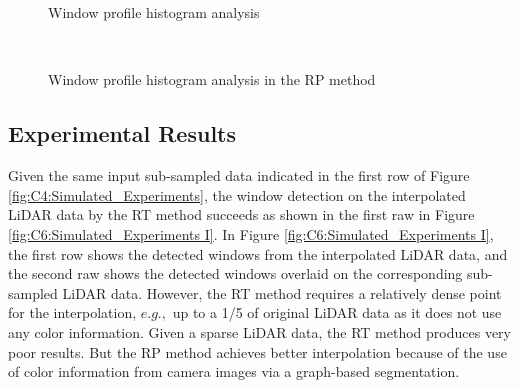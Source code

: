   
\begin{figure}[H]
\centering
{} 
\hspace{.1in}
 \\
\hspace{.1in}
 \\
\hspace{.1in}
\caption{Window profile histogram analysis} 
\label{fig:C6:ItrHist}
\end{figure}

\begin{figure}[H]
\centering
{} 
\hspace{.1in}
 \\
\caption{Window profile histogram analysis in the RP method} 
\label{fig:C6:RPHist}
\end{figure}

\subsection{Experimental Results}

Given the same input sub-sampled data indicated in the first row of Figure \ref{fig:C4:Simulated_Experiments}, the window detection on the interpolated LiDAR data by the RT method  succeeds as shown in the first raw in Figure \ref{fig:C6:Simulated_Experiments I}. In Figure \ref{fig:C6:Simulated_Experiments I}, the first row shows
the detected windows from the interpolated LiDAR data, and the
second raw shows the detected windows overlaid on the corresponding sub-sampled LiDAR data. However, the RT method requires a relatively dense point for the interpolation, $e.g.,$ up to a 1/5 of original LiDAR data as it does not use any color information. Given a sparse LiDAR data, the RT method produces
very poor results. But the RP method achieves better interpolation
because of the use of color information from camera images via
a graph-based segmentation. 

